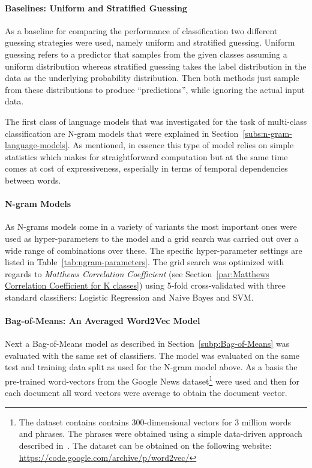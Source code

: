 \paragraph{Baselines: Uniform and Stratified Guessing}
\label{par:Baselines: Uniform and Stratified Guessing}

As a baseline for comparing the performance of classification two different guessing strategies were used, namely uniform and stratified guessing.
Uniform guessing refers to a predictor that samples from the given classes assuming a uniform distribution whereas stratified guessing takes the label distribution in the data as the underlying probability distribution.
Then both methods just sample from these distributions to produce ``predictions'', while ignoring the actual input data.

The first class of language models that was investigated for the task of multi-class classification are N-gram models that were explained in Section~\ref{subs:n-gram-language-models}. As mentioned, in essence this type of model relies on simple statistics which makes for straightforward computation but at the same time comes at cost of expressiveness, especially in terms of temporal dependencies between words.

\paragraph{N-gram Models}
\label{par:N-gram Models}

As N-grams models come in a variety of variants the most important ones were used as hyper-parameters to the model and a grid search was carried out over a wide range of combinations over these. The specific hyper-parameter settings are listed in Table~\ref{tab:ngram-parameters}. The grid search was optimized with regards to \emph{Matthews Correlation Coefficient} (see Section~\ref{par:Matthews Correlation Coefficient for K classes}) using 5-fold cross-validated with three standard classifiers: Logistic Regression and Naive Bayes and SVM.

\paragraph{Bag-of-Means: An Averaged Word2Vec Model}
\label{par:Bag-of-Means: An Averaged Word2Vec Model}

Next a Bag-of-Means model as described in Section~\ref{subp:Bag-of-Means} was evaluated with the same set of classifiers. The model was evaluated on the same test and training data split as used for the N-gram model above. As a basis the pre-trained word-vectors from the Google News dataset\footnote{The dataset contains contains 300-dimensional vectors for 3 million words and phrases. The phrases were obtained using a simple data-driven approach described in~\cite{Mikolov:2013ab}. The dataset can be obtained on the following website: \url{https://code.google.com/archive/p/word2vec/}} were used and then for each document all word vectors were average to obtain the document vector.

